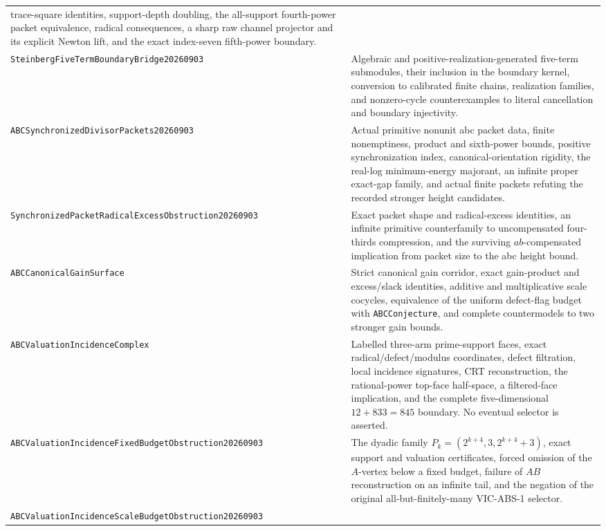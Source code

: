 \documentclass[11pt]{amsart}
\theoremstyle{definition}
\theoremstyle{remark}
\begin{document}
\begin{longtable}{>{\raggedright\arraybackslash}p{}>{\raggedright\arraybackslash}p{}}
trace-square identities, support-depth doubling, the all-support fourth-power
packet equivalence, radical consequences, a sharp raw channel projector and
its explicit Newton lift, and the exact index-seven fifth-power boundary.\\[3pt]
\texttt{SteinbergFiveTermBoundary\allowbreak Bridge20260903} & Algebraic and
positive-realization-generated five-term submodules, their inclusion in the
boundary kernel, conversion to calibrated finite chains, realization families, and
nonzero-cycle counterexamples to literal cancellation and boundary
injectivity.\\[3pt]
\texttt{ABCSynchronizedDivisor\allowbreak Packets20260903} & Actual primitive
nonunit abc packet data, finite nonemptiness, product and sixth-power bounds,
positive synchronization index, canonical-orientation rigidity, the real-log
minimum-energy majorant, an infinite proper exact-gap family, and actual
finite packets refuting the recorded stronger height candidates.\\[3pt]
\texttt{SynchronizedPacketRadicalExcess\allowbreak Obstruction20260903} &
Exact packet shape and radical-excess identities, an infinite primitive
counterfamily to uncompensated four-thirds compression, and the surviving
$ab$-compensated implication from packet size to the abc height bound.\\[3pt]
\texttt{ABCCanonicalGainSurface\allowbreak 20260903} & Strict canonical
gain corridor, exact gain-product and excess/slack identities, additive and
multiplicative scale cocycles, equivalence of the uniform defect-flag budget
with \texttt{ABCConjecture}, and complete countermodels to two stronger gain
bounds.\\[3pt]
\texttt{ABCValuationIncidenceComplex\allowbreak 20260903} & Labelled
three-arm prime-support faces, exact radical/defect/modulus coordinates,
defect filtration, local incidence signatures, CRT reconstruction, the
rational-power top-face half-space, a filtered-face implication, and the
complete five-dimensional $12+833=845$ boundary.  No eventual selector is
asserted.\\[3pt]
\texttt{ABCValuationIncidenceFixedBudget\allowbreak Obstruction20260903} &
The dyadic family $P_k=(2^{k+4},3,2^{k+4}+3)$, exact support and valuation
certificates, forced omission of the $A$-vertex below a fixed budget, failure
of $AB$ reconstruction on an infinite tail, and the negation of the original
all-but-finitely-many VIC-ABS-1 selector.\\[3pt]
\texttt{ABCValuation\allowbreak IncidenceScaleBudget\allowbreak Obstruction20260903} &

\end{longtable}
\end{document}

